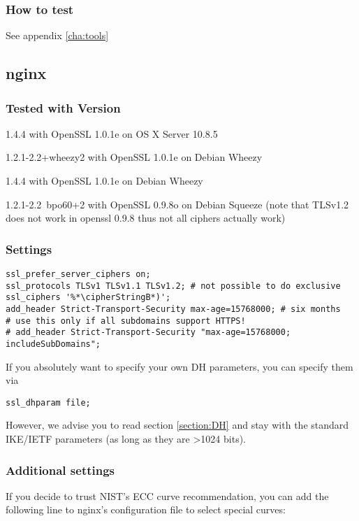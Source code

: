 \subsubsection{How to test} 
See appendix \ref{cha:tools}


\subsection{nginx}

\subsubsection{Tested with Version} 
\begin{itemize*}
  \item 1.4.4 with OpenSSL 1.0.1e on OS X Server 10.8.5
  \item 1.2.1-2.2+wheezy2 with OpenSSL 1.0.1e on Debian Wheezy
  \item 1.4.4 with OpenSSL 1.0.1e on Debian Wheezy
  \item 1.2.1-2.2~bpo60+2 with OpenSSL 0.9.8o on Debian Squeeze (note that TLSv1.2 does not work in openssl 0.9.8 thus not all ciphers actually work)
\end{itemize*}


\subsubsection{Settings}
\begin{lstlisting}
ssl_prefer_server_ciphers on;
ssl_protocols TLSv1 TLSv1.1 TLSv1.2; # not possible to do exclusive
ssl_ciphers '%*\cipherStringB*)';
add_header Strict-Transport-Security max-age=15768000; # six months
# use this only if all subdomains support HTTPS!
# add_header Strict-Transport-Security "max-age=15768000; includeSubDomains";
\end{lstlisting}

If you absolutely want to specify your own DH parameters, you can specify them via

\begin{lstlisting}
ssl_dhparam file;
\end{lstlisting}

However, we advise you to read section \ref{section:DH} and stay with the standard IKE/IETF parameters (as long as they are \textgreater 1024 bits).

\subsubsection{Additional settings}
If you decide to trust NIST's ECC curve recommendation, you can add the following line to nginx's configuration file to select special curves:

